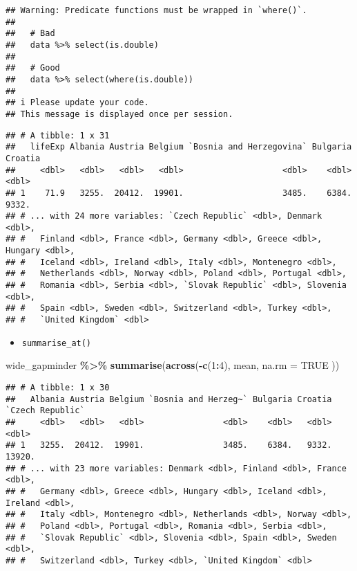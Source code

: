\documentclass[
]{book}
\newenvironment{Shaded}{\begin{snugshade}}{\end{snugshade}}
\newcommand{\DataTypeTok}[1]{\textcolor[rgb]{0.13,0.29,0.53}{#1}}
\newcommand{\DecValTok}[1]{\textcolor[rgb]{0.00,0.00,0.81}{#1}}
\newcommand{\KeywordTok}[1]{\textcolor[rgb]{0.13,0.29,0.53}{\textbf{#1}}}
\newcommand{\NormalTok}[1]{#1}
\newcommand{\OperatorTok}[1]{\textcolor[rgb]{0.81,0.36,0.00}{\textbf{#1}}}
\newcommand{\OtherTok}[1]{\textcolor[rgb]{0.56,0.35,0.01}{#1}}
\newcommand{\StringTok}[1]{\textcolor[rgb]{0.31,0.60,0.02}{#1}}
\providecommand{\tightlist}{%
  \setlength{\itemsep}{0pt}\setlength{\parskip}{0pt}}
\begin{document}
\begin{verbatim}
## Warning: Predicate functions must be wrapped in `where()`.
## 
##   # Bad
##   data %>% select(is.double)
## 
##   # Good
##   data %>% select(where(is.double))
## 
## i Please update your code.
## This message is displayed once per session.
\end{verbatim}

\begin{verbatim}
## # A tibble: 1 x 31
##   lifeExp Albania Austria Belgium `Bosnia and Herzegovina` Bulgaria Croatia
##     <dbl>   <dbl>   <dbl>   <dbl>                    <dbl>    <dbl>   <dbl>
## 1    71.9   3255.  20412.  19901.                    3485.    6384.   9332.
## # ... with 24 more variables: `Czech Republic` <dbl>, Denmark <dbl>,
## #   Finland <dbl>, France <dbl>, Germany <dbl>, Greece <dbl>, Hungary <dbl>,
## #   Iceland <dbl>, Ireland <dbl>, Italy <dbl>, Montenegro <dbl>,
## #   Netherlands <dbl>, Norway <dbl>, Poland <dbl>, Portugal <dbl>,
## #   Romania <dbl>, Serbia <dbl>, `Slovak Republic` <dbl>, Slovenia <dbl>,
## #   Spain <dbl>, Sweden <dbl>, Switzerland <dbl>, Turkey <dbl>,
## #   `United Kingdom` <dbl>
\end{verbatim}

\begin{itemize}
\tightlist
\item
  \texttt{summarise\_at()}
\end{itemize}

\begin{Shaded}
\begin{Highlighting}[]
\NormalTok{wide\_gapminder }\OperatorTok{\%\textgreater{}\%}
\StringTok{  }\KeywordTok{summarise}\NormalTok{(}\KeywordTok{across}\NormalTok{(}\OperatorTok{{-}}\KeywordTok{c}\NormalTok{(}\DecValTok{1}\OperatorTok{:}\DecValTok{4}\NormalTok{),}
\NormalTok{    mean,}
    \DataTypeTok{na.rm =} \OtherTok{TRUE}
\NormalTok{  ))}
\end{Highlighting}
\end{Shaded}

\begin{verbatim}
## # A tibble: 1 x 30
##   Albania Austria Belgium `Bosnia and Herzeg~` Bulgaria Croatia `Czech Republic`
##     <dbl>   <dbl>   <dbl>                <dbl>    <dbl>   <dbl>            <dbl>
## 1   3255.  20412.  19901.                3485.    6384.   9332.           13920.
## # ... with 23 more variables: Denmark <dbl>, Finland <dbl>, France <dbl>,
## #   Germany <dbl>, Greece <dbl>, Hungary <dbl>, Iceland <dbl>, Ireland <dbl>,
## #   Italy <dbl>, Montenegro <dbl>, Netherlands <dbl>, Norway <dbl>,
## #   Poland <dbl>, Portugal <dbl>, Romania <dbl>, Serbia <dbl>,
## #   `Slovak Republic` <dbl>, Slovenia <dbl>, Spain <dbl>, Sweden <dbl>,
## #   Switzerland <dbl>, Turkey <dbl>, `United Kingdom` <dbl>
\end{verbatim}
\end{document}
